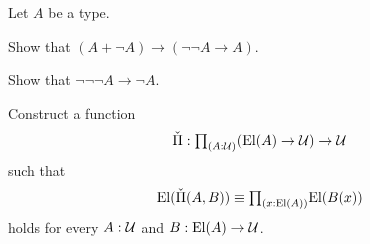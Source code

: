 \begin{exercises}
\item Let $A$ be a type.
  \begin{subexenum}
  \item Show that $(A+\neg A)\to(\neg\neg A\to A)$.
  \item Show that $\neg\neg\neg A \to \neg A$.
  \end{subexenum}
\item Construct a function
  \begin{equation*}
    \check{\Pi}:\prd{A:\UU} (\mathrm{El}(A)\to\UU)\to \UU
  \end{equation*}
  such that
  \begin{equation*}
    \mathrm{El}(\check{\Pi}(A,B))\jdeq \prd{x:\mathrm{El}(A)}\mathrm{El}(B(x))
  \end{equation*}
  holds for every $A:\mathcal{U}$ and $B:\mathrm{El}(A)\to\mathcal{U}$. 
  

\end{exercises}
